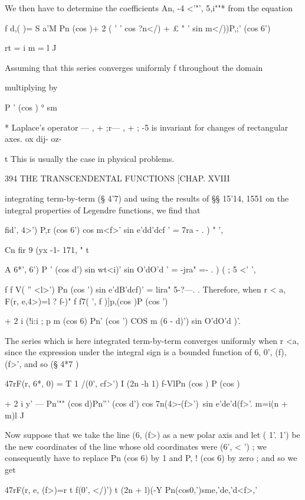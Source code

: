 We then have to determine the coefficients An, -4 <'"', 5,i""* from the 
equation 



f d,( )= S a'M Pn (cos  )+ 2 (  ' ' cos ?n</) + £ " ' sin m</))P,;'  (cos 6')   

rt = i m = l J 

Assuming that this series converges uniformly f throughout the domain 

multiplying by 

P '  (cos  )  °%
sm   

* Laplace's operator  — , + ;r— , + ; -5 is invariant for changes of rectangular axes. 
ox  dij- oz- 

t This is usually the case in physical problems. 



394 THE TRANSCENDENTAL FUNCTIONS [CHAP. XVIII 

integrating term-by-term (§ 4'7) and using the results of §§ 15'14, 1551 on 
the integral properties of Legendre functions, we find that 

fid', 4>') P,r (cos 6') cos m<f>' sin e'dd'dcf ' = 7ra  -   . )   " ', 

Cn fir 9 (yx -1- 171, "  t 

A 6*', 6') P '  (cos d') sin wt<i)' sin O'dO'd ' = -jra"   =- . ) ( ; 5 <' ', 

f f V( '' <l>') Pn (cos  ') sin e'dB'dcf)' = lira"  5-?—.   . 
Therefore, when r < a, 
F(r, e,4>)=l ?  f-)" f  f7( ', f )]p,(cos )P (cos ') 

+ 2 i (!i:i ; p  m (cos 6) Pn'  (cos  ') COS m (6 - d)')  sin O'dO'd )'. 

The series which is here integrated term-by-term converges uniformly 
when r <a, since the expression under the integral sign is a bounded 
function of 6, 0', (f), (f>', and so (§ 4*7 ) 

47rF(r, 6*, 0) = T 1 /(0', cf>') I (2n -h 1) f-VlPn (cos  ) P  (cos  ) 

+ 2 i  y' —  Pn'"" (cos d)Pn''' (cos d') cos 7n(4>-(f>')\ sin e'de'd(f>'. 
m=i(n + m)l J 

Now suppose that we take the line (6, (f>) as a new polar axis and let 
( 1'.  1') be the new coordinates of the line whose old coordinates were (6', < ') ; 
we consequently have to replace Pn (cos 6) by 1 and P, !  (cos 6) by zero ; and 
so we get 

47rF(r, e, (f>)=r t  f(0', </)') t (2n + l)(-Y Pn(cos0,')sme,'de,'d<f>,' 

